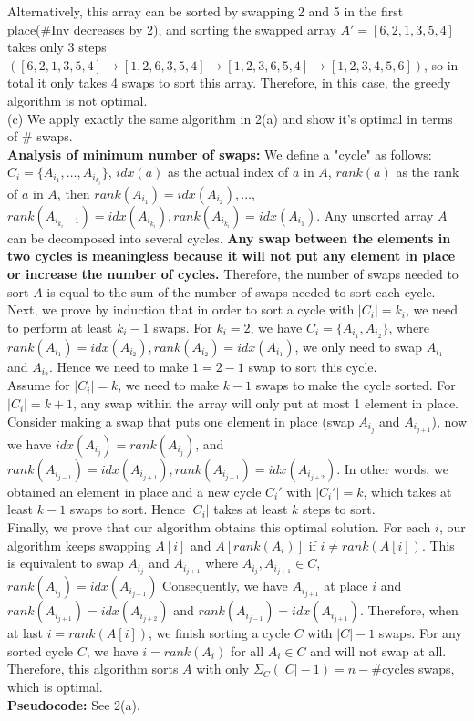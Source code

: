 \documentclass[11pt,twoside]{article}
\newenvironment{solution}{{\par\noindent\it Solution.}}{}
\begin{document}
\begin{solution}
Alternatively, this array can be sorted by swapping 2 and 5 in the first place(\#Inv decreases by 2), and sorting the swapped array $A'=[6,2,1,3,5,4]$ takes only 3 steps
$([6,2,1,3,5,4]\rightarrow[1,2,6,3,5,4]\rightarrow[1,2,3,6,5,4]\rightarrow[1,2,3,4,5,6])$, so in total it only takes 4 swaps to sort this array.
Therefore, in this case, the greedy algorithm is not optimal.
\vspace{5pt}\\
(c) We apply exactly the same algorithm in 2(a) and show it's optimal in terms of \# swaps.\\
\textbf{Analysis of minimum number of swaps: }We define a "cycle" as follows: $C_i=\{A_{i_1},\dots,A_{i_{k_i}}\}$,
$idx(a)$ as the actual index of $a$ in $A$, $rank(a)$ as the rank of $a$ in $A$, 
then $rank(A_{i_1})=idx(A_{i_2}),\dots,$ $rank(A_{i_{k_i}-1})=idx(A_{i_{k_i}}), rank(A_{i_{k_i}})=idx(A_{i_1})$.
Any unsorted array $A$ can be decomposed into several cycles. \textbf{Any swap between the elements in two cycles is meaningless because it will not put any element in place or increase the number of cycles.}
Therefore, the number of swaps needed to sort $A$ is equal to the sum of the number of swaps needed to sort each cycle.
\vspace{5pt}\\
Next, we prove by induction that in order to sort a cycle with $|C_i|=k_i$, we need to perform at least $k_i-1$ swaps.
For $k_i=2$, we have $C_i=\{A_{i_1}, A_{i_2}\}$, where $rank(A_{i_1})=idx(A_{i_2}),rank(A_{i_2})=idx(A_{i_1})$, we only need to swap $A_{i_1}$ and $A_{i_2}$.
Hence we need to make $1=2-1$ swap to sort this cycle.
\vspace{5pt}\\
Assume for $|C_i|=k$, we need to make $k-1$ swaps to make the cycle sorted. 
For $|C_i|=k+1$, any swap within the array will only put at most 1 element in place.
Consider making a swap that puts one element in place (swap $A_{i_j}$ and $A_{i_{j+1}}$), now we have $idx(A_{i_j})=rank(A_{i_j})$,
and $rank(A_{i_{j-1}})=idx(A_{i_{j+1}}), rank(A_{i_{j+1}})=idx(A_{i_{j+2}})$. In other words, we obtained an element in place and a new cycle $C_i'$ with $|C_i'|=k$,
which takes at least $k-1$ swaps to sort. Hence $|C_i|$ takes at least $k$ steps to sort.
\vspace{5pt}\\
Finally, we prove that our algorithm obtains this optimal solution. 
For each $i$, our algorithm keeps swapping $A[i]$ and $A[rank(A_i)]$ if $i\neq rank(A[i])$.
This is equivalent to swap $A_{i_j}$ and $A_{i_{j+1}}$ where $A_{i_j}, A_{i_{j+1}}\in C$, $rank(A_{i_j})=idx(A_{i_{j+1}})$
Consequently, we have $A_{i_{j+1}}$ at place $i$ and $rank(A_{i_{j+1}})=idx(A_{i_{j+2}})$ and $rank(A_{i_{j-1}})=idx(A_{i_{j+1}})$.
Therefore, when at last $i=rank(A[i])$, we finish sorting a cycle $C$ with $|C|-1$ swaps.
For any sorted cycle $C$, we have $i=rank(A_i)$ for all $A_i\in C$ and will not swap at all.
Therefore, this algorithm sorts $A$ with only $\Sigma_{C}(|C|-1)=n-\#\text{cycles}$ swaps, which is optimal.
\vspace{5pt}\\
\textbf{Pseudocode: }See 2(a).
\end{solution}
\end{document}
